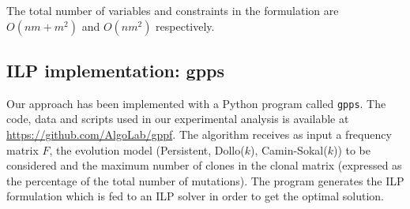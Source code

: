\documentclass[a4paper,USenglish]{article}
\theoremstyle{definition}
\begin{document}






The  total  number of  variables  and  constraints  in  the formulation  are
$O(nm+m^2)$ and $O(nm^2)$ respectively.

\subsection{ILP implementation: gpps}

Our approach has been implemented with a  Python program called \texttt{gpps}. 
  The code, data and scripts used in our experimental analysis is 
  available at \url{https://github.com/AlgoLab/gppf}.
The algorithm receives as input  a frequency matrix $F$, the evolution
  model  (Persistent, Dollo($k$),  Camin-Sokal($k$)) to  be considered
  and the maximum number of clones in the clonal matrix (expressed
  as the percentage of the total number of mutations).
The  program generates  the ILP  formulation which  is fed  to an  ILP
  solver in order to get the optimal solution.
\end{document}
